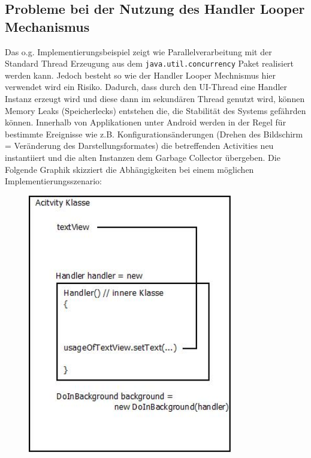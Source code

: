 \documentclass[12pt,oneside,a4paper,bibtotoc,liststotoc]{scrreprt}
\begin{document}
\subsection{Probleme bei der Nutzung des Handler Looper Mechanismus}
Das o.g. Implementierungsbeispiel zeigt wie Parallelverarbeitung mit der Standard Thread Erzeugung aus dem \texttt{java.util.concurrency} Paket realisiert werden kann. Jedoch besteht so wie der Handler Looper Mechnismus hier verwendet wird ein Risiko. Dadurch, dass durch den UI-Thread eine Handler Instanz erzeugt wird und diese dann im sekundären Thread genutzt wird, können Memory Leaks (Speicherlecks) entstehen die, die Stabilität des Systems gefährden können. Innerhalb von Applikationen unter Android werden in der Regel für bestimmte Ereignisse wie z.B. Konfigurationsänderungen (Drehen des Bildschirm = Veränderung des Darstellungsformates) die betreffenden Activities neu instantiiert und die alten Instanzen dem Garbage Collector übergeben. Die Folgende Graphik skizziert die Abhängigkeiten bei einem möglichen Implementierungsszenario:
\begin{figure}[H]
  \begin{centering}
    \includegraphics[width=0.8\textwidth]{img/weakReference.jpeg}
    \label{weakReference}
  \end{centering}
\end{figure}
\end{document}
